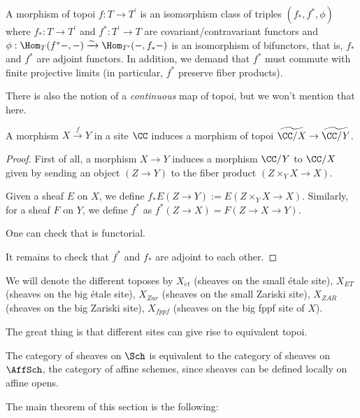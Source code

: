 \documentclass[11pt, english]{article}
\begin{document}
\begin{defi}
\label{def:toposmorphism}
A morphism of topoi $f:T \to T^\prime$ is an isomorphism class of triples $(f_\ast,f^\ast, \phi)$ where $f_\ast:T \to T^\prime$ and $f^\ast:T^\prime \to T$ are covariant/contravariant functors and $\phi:\Hom_T(f^\ast-,-) \xrightarrow{\sim} \Hom_{T^\prime} (-, f_\ast -)$ is an isomorphism of bifunctors, that is, $f_\ast$ and $f^\ast$ are adjoint functors. In addition, we demand that $f^\ast$ must commute with finite projective limits (in particular, $f^\ast$ preserve fiber products). 
\end{defi}

There is also the notion of a \emph{continuous} map of topoi, but we won't mention that here.

\begin{lemma}
A morphism $X \xrightarrow{f} Y$ in a site $\CC$ induces a morphism of topoi $\widetilde{\CC/X} \to \widetilde{\CC/Y}$.
\end{lemma}
\begin{proof}
First of all, a morphism $X \to Y$ induces a morphism $\CC/Y$ to $\CC/X$ given by sending an object $(Z \to Y)$ to the fiber product $(Z \times_Y X \to X)$. 

Given a sheaf $E$ on $X$, we define $f_\ast E(Z \to Y) := E(Z \times_Y X \to X)$. Similarly, for a sheaf $F$ on $Y$, we define $f^\ast$ as $f^\ast(Z \to X) = F(Z \to X \to Y)$. 

One can check that is functorial.

It remains to check that $f^\ast$ and $f_\ast$ are adjoint to each other.
\end{proof}

We will denote the different toposes by $X_{\acute et}$ (sheaves on the small étale site), $X_{ET}$ (sheaves on the big étale site), $X_{Zar}$ (sheaves on the small Zariski site), $X_{ZAR}$ (sheaves on the big Zariski site), $X_{fppf}$ (sheaves on the big fppf site of $X$). 

The great thing is that different sites can give rise to equivalent topoi.

\begin{example}
The category of sheaves on $\Sch$ is equivalent to the category of sheaves on $\AffSch$, the category of affine schemes, since sheaves can be defined locally on affine opens.
\end{example}

The main theorem of this section is the following:
\end{document}
